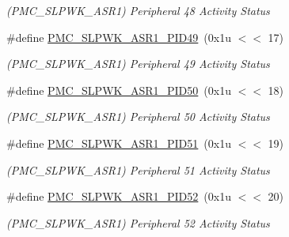 \begin{DoxyCompactItemize}
\begin{DoxyCompactList}\small\item\em (P\+M\+C\+\_\+\+S\+L\+P\+W\+K\+\_\+\+A\+S\+R1) Peripheral 48 Activity Status \end{DoxyCompactList}\item 
\mbox{\label{group__SAMS70__PMC_ga3268f328d48ae9a3b9e16a46614695f1}} 
\#define \mbox{\hyperlink{group__SAMS70__PMC_ga3268f328d48ae9a3b9e16a46614695f1}{P\+M\+C\+\_\+\+S\+L\+P\+W\+K\+\_\+\+A\+S\+R1\+\_\+\+P\+I\+D49}}~(0x1u $<$$<$ 17)
\begin{DoxyCompactList}\small\item\em (P\+M\+C\+\_\+\+S\+L\+P\+W\+K\+\_\+\+A\+S\+R1) Peripheral 49 Activity Status \end{DoxyCompactList}\item 
\mbox{\label{group__SAMS70__PMC_ga2d2d99e2b2bfd6f7d495d9117a5104a4}} 
\#define \mbox{\hyperlink{group__SAMS70__PMC_ga2d2d99e2b2bfd6f7d495d9117a5104a4}{P\+M\+C\+\_\+\+S\+L\+P\+W\+K\+\_\+\+A\+S\+R1\+\_\+\+P\+I\+D50}}~(0x1u $<$$<$ 18)
\begin{DoxyCompactList}\small\item\em (P\+M\+C\+\_\+\+S\+L\+P\+W\+K\+\_\+\+A\+S\+R1) Peripheral 50 Activity Status \end{DoxyCompactList}\item 
\mbox{\label{group__SAMS70__PMC_ga79d9a2e4a1cebaf4c5e2fa569cdba3a7}} 
\#define \mbox{\hyperlink{group__SAMS70__PMC_ga79d9a2e4a1cebaf4c5e2fa569cdba3a7}{P\+M\+C\+\_\+\+S\+L\+P\+W\+K\+\_\+\+A\+S\+R1\+\_\+\+P\+I\+D51}}~(0x1u $<$$<$ 19)
\begin{DoxyCompactList}\small\item\em (P\+M\+C\+\_\+\+S\+L\+P\+W\+K\+\_\+\+A\+S\+R1) Peripheral 51 Activity Status \end{DoxyCompactList}\item 
\mbox{\label{group__SAMS70__PMC_ga59f5331fe305469aa38139c0cf95b61e}} 
\#define \mbox{\hyperlink{group__SAMS70__PMC_ga59f5331fe305469aa38139c0cf95b61e}{P\+M\+C\+\_\+\+S\+L\+P\+W\+K\+\_\+\+A\+S\+R1\+\_\+\+P\+I\+D52}}~(0x1u $<$$<$ 20)
\begin{DoxyCompactList}\small\item\em (P\+M\+C\+\_\+\+S\+L\+P\+W\+K\+\_\+\+A\+S\+R1) Peripheral 52 Activity Status \end{DoxyCompactList}\item 

\end{DoxyCompactItemize}
